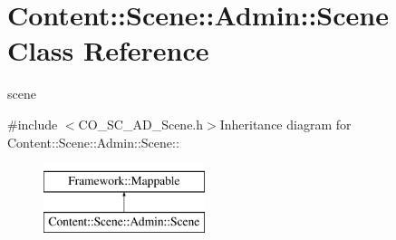 \hypertarget{classContent_1_1Scene_1_1Admin_1_1Scene}{
\section{Content::Scene::Admin::Scene Class Reference}
\label{classContent_1_1Scene_1_1Admin_1_1Scene}
}


scene  


{\ttfamily \#include $<$CO\_\-SC\_\-AD\_\-Scene.h$>$}Inheritance diagram for Content::Scene::Admin::Scene::\begin{figure}[H]
\begin{center}
\leavevmode
\includegraphics[height=2cm]{classContent_1_1Scene_1_1Admin_1_1Scene}
\end{center}
\end{figure}
